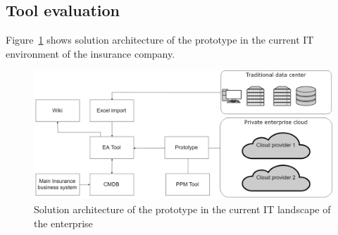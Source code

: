 \subsection{Tool evaluation}

Figure~\ref{fig:solution-architecture-prototype} shows solution architecture of the prototype in the current IT environment of the insurance company.

\begin{figure}[htpb]
  \centering
  \includegraphics[width=1.0\textwidth]{figures/solution_architecture-prototype.png}
  \caption{Solution architecture of the prototype in the current IT landscape of the enterprise}
  \label{fig:solution-architecture-prototype}
\end{figure}







